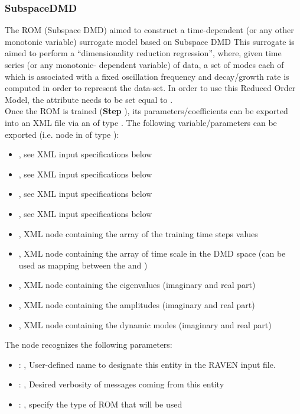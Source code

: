 \subsubsection{SubspaceDMD}
  The  ROM (Subspace DMD) aimed to construct a time-dependent (or any other
  monotonic     variable) surrogate model based on Subspace DMD     This surrogate is aimed to
  perform a ``dimensionality reduction regression'', where, given time     series (or any monotonic-
  dependent variable) of data, a set of modes each of which is associated     with a fixed
  oscillation frequency and decay/growth rate is computed     in order to represent the data-set.
  In order to use this Reduced Order Model, the  attribute      needs
  to be set equal to .     \\     Once the ROM  is trained (\textbf{Step}
  ), its parameters/coefficients can be exported into an XML file     via an
   of type . The following variable/parameters  can be exported
  (i.e.  node     in  of type ):     \begin{itemize}
  \item {}, see XML input specifications below       \item {},
  see XML input specifications below       \item {}, see XML input
  specifications below       \item {}, see XML input specifications below
  \item {}, XML node containing the array of the training time steps values
  \item {}, XML node containing the array of time scale in the DMD space (can be
  used as mapping       between the   and )       \item
  , XML node containing the eigenvalues (imaginary and real part)       \item
  , XML node containing the amplitudes (imaginary and real part)       \item
  , XML node containing the dynamic modes (imaginary and real part)     \end{itemize}

  The  node recognizes the following parameters:
    \begin{itemize}
      \item {}: , 
        User-defined name to designate this entity in the RAVEN input file.
      \item {}: , 
        Desired verbosity of messages coming from this entity
      \item {}: , 
        specify the type of ROM that will be used
  \end{itemize}

